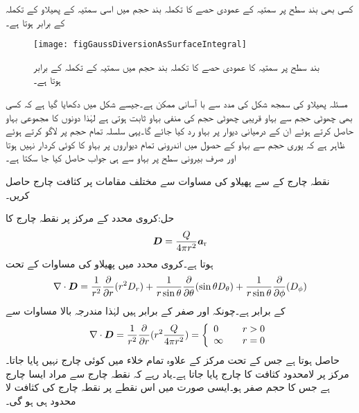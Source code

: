 کسی بھی بند سطح پر  سمتیہ کے عمودی حصے کا تکملہ بند حجم میں اسی سمتیہ کے پھیلاو کے تکملہ کے برابر ہوتا ہے۔

\begin{figure}
\centering
\texttt{[image: figGaussDiversionAsSurfaceIntegral]}
\caption{بند سطح پر سمتیہ کا عمودی حصے کا تکملہ بند حجم میں سمتیہ کے تکملہ کے برابر ہوتا ہے۔}
\label{شکل_گاؤس_پھیلاو_بطور_سطحی_تکلہ}
\end{figure}

مسئلہ پھیلاو کی سمجھ شکل  کی مدد سے با آسانی ممکن ہے۔جیسے شکل میں دکھایا گیا ہے کہ کسی بھی چھوٹی حجم سے بہاو قریبی چھوٹی حجم  کی منفی بہاو ثابت ہوتی ہے لہٰذا دونوں کا مجموعی بہاو  حاصل کرتے ہوئے ان کے درمیانی دیوار  پر بہاو رد کیا جائے گا۔یہی سلسلہ تمام حجم پر لاگو کرتے ہوئے ظاہر ہے کہ پوری حجم سے بہاو کے حصول میں اندرونی تمام دیواروں پر بہاو کا کوئی کردار نہیں ہوتا اور صرف بیرونی سطح پر بہاو سے ہی جواب حاصل کیا جا سکتا ہے۔

نقطہ چارج کے  سے پھیلاو کی مساوات سے مختلف مقامات پر کثافت چارج  حاصل کریں۔

حل:کروی محدد کے مرکز پر نقطہ چارج کا
\begin{align*}
{\ensuremath{{\boldsymbol{D}}}}=\frac{Q}{4\pi r^2} {\boldsymbol{a}}_{\textup{r}}
\end{align*}
ہوتا ہے۔کروی محدد میں پھیلاو کی مساوات کے تحت
\begin{align*}
\nabla \cdot {\ensuremath{{\boldsymbol{D}}}}=\frac{1}{r^2 }\frac{\partial }{\partial r} (r^2   D_{r})+\frac{1}{r \sin \theta }\frac{\partial }{\partial \theta} (\sin \theta  D_{\theta})+\frac{1}{r \sin \theta }\frac{\partial }{\partial \phi} (  D_{\phi}) 
\end{align*}
کے برابر ہے۔چونکہ  اور  صفر کے برابر ہیں لہٰذا مندرجہ بالا مساوات سے
\begin{align*}
\nabla \cdot {\ensuremath{{\boldsymbol{D}}}}=\frac{1}{r^2 }\frac{\partial }{\partial r} (r^2 \frac{Q}{4\pi r^2}  )=\left\{
\begin{array}{l  l}
0 &\quad r> 0\\
\infty & \quad r=0
\end{array}
\right.
\end{align*}
حاصل ہوتا ہے جس کے تحت مرکز کے علاوہ تمام خلاء میں کوئی چارج نہیں پایا جاتا۔مرکز پر لامحدود کثافت کا چارج پایا جاتا ہے۔یاد رہے کہ نقطہ چارج سے مراد ایسا چارج ہے جس کا حجم صفر ہو۔ایسی صورت میں اس نقطے پر نقطہ چارج کی کثافت لا محدود ہی ہو گی۔

